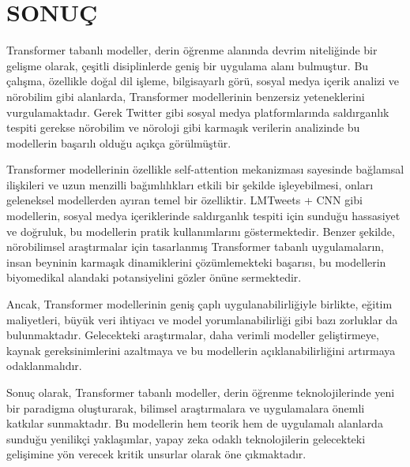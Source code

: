 \documentclass{article}
\begin{document}
\section{SONUÇ}

Transformer tabanlı modeller, derin öğrenme alanında devrim niteliğinde bir gelişme olarak, çeşitli disiplinlerde geniş bir uygulama alanı bulmuştur. Bu çalışma, özellikle doğal dil işleme, bilgisayarlı görü, sosyal medya içerik analizi ve nörobilim gibi alanlarda, Transformer modellerinin benzersiz yeteneklerini vurgulamaktadır. Gerek Twitter gibi sosyal medya platformlarında saldırganlık tespiti gerekse nörobilim ve nöroloji gibi karmaşık verilerin analizinde bu modellerin başarılı olduğu açıkça görülmüştür.

Transformer modellerinin özellikle self-attention mekanizması sayesinde bağlamsal ilişkileri ve uzun menzilli bağımlılıkları etkili bir şekilde işleyebilmesi, onları geleneksel modellerden ayıran temel bir özelliktir. LMTweets + CNN gibi modellerin, sosyal medya içeriklerinde saldırganlık tespiti için sunduğu hassasiyet ve doğruluk, bu modellerin pratik kullanımlarını göstermektedir. Benzer şekilde, nörobilimsel araştırmalar için tasarlanmış Transformer tabanlı uygulamaların, insan beyninin karmaşık dinamiklerini çözümlemekteki başarısı, bu modellerin biyomedikal alandaki potansiyelini gözler önüne sermektedir.

Ancak, Transformer modellerinin geniş çaplı uygulanabilirliğiyle birlikte, eğitim maliyetleri, büyük veri ihtiyacı ve model yorumlanabilirliği gibi bazı zorluklar da bulunmaktadır. Gelecekteki araştırmalar, daha verimli modeller geliştirmeye, kaynak gereksinimlerini azaltmaya ve bu modellerin açıklanabilirliğini artırmaya odaklanmalıdır.

Sonuç olarak, Transformer tabanlı modeller, derin öğrenme teknolojilerinde yeni bir paradigma oluşturarak, bilimsel araştırmalara ve uygulamalara önemli katkılar sunmaktadır. Bu modellerin hem teorik hem de uygulamalı alanlarda sunduğu yenilikçi yaklaşımlar, yapay zeka odaklı teknolojilerin gelecekteki gelişimine yön verecek kritik unsurlar olarak öne çıkmaktadır. 



\end{document}
